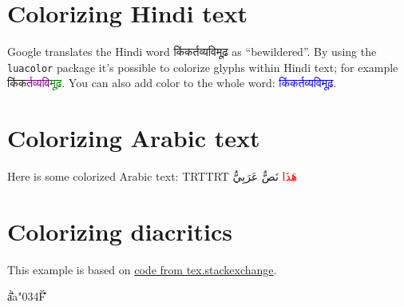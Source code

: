 \documentclass{article}
\newcommand\hinditext[1]{\foreignlanguage{hindi}{#1}}
\newcommand\arabictext[1]{\foreignlanguage{arabic}{#1}}
\begin{document}
	\setlength{\baselineskip}{14bp}
	
	\section{Colorizing Hindi text}
	Google translates the Hindi word \textsf{\hinditext{किंकर्तव्यविमूढ़}} as
	``bewildered''. By using the \texttt{luacolor} package it's possible to colorize glyphs within Hindi text; for example \hinditext{किंक\textcolor{purple}{र्तव्यव}\textcolor{green}{िमूढ़}}. You can also add color to the whole word: \hinditext{\textcolor{blue}{किंकर्तव्यविमूढ़}}.
	
	\section{Colorizing Arabic text}
	\newenvironment{colorarabic}
	{%
		\fontsize{30}{30}
		\pardir TRT\textdir TRT}
	{}
	
	Here is some colorized Arabic text:  \begin{colorarabic}
		\textcolor{red}{\arabictext{هَذَا}} \arabictext{نَصٌّ عَرَب}\textcolor{green}{\arabictext{ِ}}\arabictext{ي}\textcolor{blue}{\arabictext{ٌّ}}
	\end{colorarabic}
	\section{Colorizing diacritics}
	This example is based on \href{https://tex.stackexchange.com/questions/698933/color-breaks-diacritics-stacking}{code from tex.stackexchange}.
	
	\vspace{12pt}
	\bgroup
	\newcommand{\emptydiacritic}{\char"034F}
	\fontsize{60}{60}\selectfont
	á̀̐{\color{blue}a\emptydiacritic\color{green}́\color{red}̀\color{magenta}̐
		\egroup
	
\end{document}
